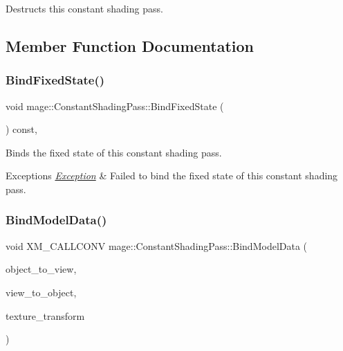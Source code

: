 Destructs this constant shading pass. 

\subsection{Member Function Documentation}
\hypertarget{classmage_1_1_constant_shading_pass_abaffc9382398ac71050705e55f02b4fd}{}\label{classmage_1_1_constant_shading_pass_abaffc9382398ac71050705e55f02b4fd} 
\subsubsection{\texorpdfstring{Bind\+Fixed\+State()}{BindFixedState()}}
{\footnotesize\ttfamily void mage\+::\+Constant\+Shading\+Pass\+::\+Bind\+Fixed\+State (\begin{DoxyParamCaption}{ }\end{DoxyParamCaption}) const\hspace{0.3cm}{\ttfamily [private]}, {\ttfamily [noexcept]}}

Binds the fixed state of this constant shading pass.


\begin{DoxyExceptions}{Exceptions}
{\em \hyperlink{classmage_1_1_exception}{Exception}} & Failed to bind the fixed state of this constant shading pass. \\
\hline
\end{DoxyExceptions}
\hypertarget{classmage_1_1_constant_shading_pass_a512f1c4284e475e94502530bd37367b4}{}\label{classmage_1_1_constant_shading_pass_a512f1c4284e475e94502530bd37367b4} 
\subsubsection{\texorpdfstring{Bind\+Model\+Data()}{BindModelData()}}
{\footnotesize\ttfamily void X\+M\+\_\+\+C\+A\+L\+L\+C\+O\+NV mage\+::\+Constant\+Shading\+Pass\+::\+Bind\+Model\+Data (\begin{DoxyParamCaption}\item[{F\+X\+M\+M\+A\+T\+R\+IX}]{object\+\_\+to\+\_\+view,  }\item[{C\+X\+M\+M\+A\+T\+R\+IX}]{view\+\_\+to\+\_\+object,  }\item[{C\+X\+M\+M\+A\+T\+R\+IX}]{texture\+\_\+transform }\end{DoxyParamCaption})\hspace{0.3cm}{\ttfamily [private]}}

